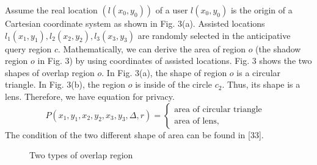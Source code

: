 \documentclass[a4paper,fleqn]{cas-dc}
\begin{document}
Assume the real location $(l(x_0, y_0))$ of a user $l(x_0, y_0)$ is the origin of a Cartesian coordinate system as shown in Fig. 3(a). Assisted locations $l_1(x_1, y_1), l_2(x_2, y_2), l_3(x_3, y_3)$ are randomly selected in the anticipative query region $c$. Mathematically, we can derive the area of region $o$ (the shadow region $o$ in Fig. 3) by using coordinates of assisted locations. Fig. 3 shows the two shapes of overlap region $o$. In Fig. 3(a), the shape of region $o$ is a circular triangle. In Fig. 3(b), the region $o$ is inside of the circle $c_2$. Thus, its shape is a lens. Therefore, we have equation for privacy.
\begin{equation}
P(x_1,y_1,x_2,y_2,x_3,y_3,\Delta, r) =
\left\{
    \begin{array}{l}
        \text{area of circular triangle} & \\
        \text{area of lens,} &
    \end{array}
\right.
\end{equation}
The condition of the two different shape of area can be found in [33]. 
\\
\begin{figure}
\centering
    \caption{  Two types of overlap region}
    \label{fig:foo}
\end{figure}
\end{document}
